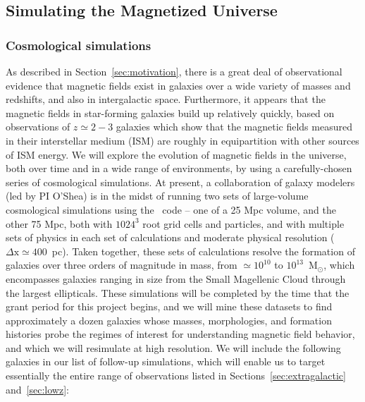 \subsection{Simulating the Magnetized Universe}
\label{sec:simulations}
\vspace{-1mm}

\subsubsection{Cosmological simulations}
\label{sec:cosmo_sims}
\vspace{-2mm}

As described in Section~\ref{sec:motivation}, there is a great deal of
observational evidence that magnetic fields exist in galaxies over a
wide variety of masses and redshifts, and also in intergalactic space.
Furthermore, it appears that the magnetic fields in star-forming
galaxies build up relatively quickly, based on observations of $z
\simeq 2-3$ galaxies which show that the magnetic fields measured in
their interstellar medium (ISM) are roughly in equipartition with
other sources of ISM energy.  We will explore the evolution of
magnetic fields in the universe, both over time and in a wide range of
environments, by using a carefully-chosen series of cosmological
simulations.  At present, a collaboration of galaxy modelers
(led by PI O'Shea) is in the midst of running two sets of
large-volume cosmological simulations using the \enzo\ code -- one of
a 25 Mpc volume, and the other 75 Mpc, both with $1024^3$ root grid
cells and particles, and with multiple sets of physics in each set of
calculations and moderate physical resolution ($\Delta \mathrm{x} \simeq 400$~pc).  Taken together, these sets of calculations resolve the
formation of galaxies over three orders of magnitude in mass, from
$\simeq 10^{10}$ to $10^{13}$~M$_\odot$, which encompasses galaxies
ranging in size from the Small Magellenic Cloud through the largest
ellipticals.  These simulations will be completed by the time that the
grant period for this project begins, and we will mine these datasets
to find approximately a dozen galaxies whose masses, morphologies, and
formation histories probe the regimes of interest for understanding
magnetic field behavior, and which we will resimulate at high resolution.  We will include
the following galaxies in our list of follow-up simulations,
which will enable us to target essentially the entire range of
observations listed in Sections~\ref{sec:extragalactic}
and~\ref{sec:lowz}:

